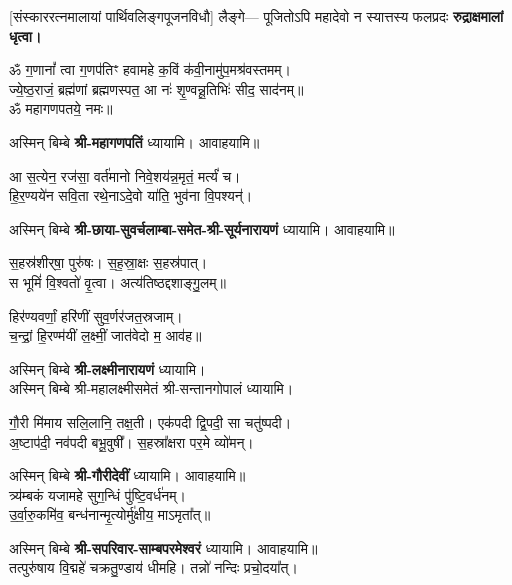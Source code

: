 [संस्काररत्नमालायां पार्थिवलिङ्गपूजनविधौ] लैङ्गे—
{पूजितोऽपि महादेवो न स्यात्तस्य फलप्रदः}
\textbf{रुद्राक्षमालां धृत्वा।}





\begin{center}


ॐ ग॒णानां᳚ त्वा ग॒णप॑तिꣳ हवामहे क॒विं क॑वी॒नामु॑प॒मश्र॑\-वस्तमम्।\\
ज्ये॒ष्ठ॒राजं॒ ब्रह्म॑णां ब्रह्मणस्पत॒ आ नः॑ शृ॒ण्वन्नू॒तिभिः॑ सीद॒ साद॑नम्॥\\
ॐ महागणपतये॒ नमः॥

अस्मिन् बिम्बे \textbf{श्री-महागणपतिं} ध्यायामि। आवाहयामि॥

आ स॒त्येन॒ रज॑सा॒ वर्त॑मानो निवे॒शय॑न्न॒मृतं॒ मर्त्यं॑ च।\\
हि॒र॒ण्यये॑न सवि॒ता रथे॒नाऽदे॒वो या॑ति॒ भुव॑ना वि॒पश्यन्॑।

अस्मिन् बिम्बे \textbf{श्री-छाया-सुवर्चलाम्बा-समेत-श्री-सूर्यनारायणं} ध्यायामि। आवाहयामि॥

स॒हस्र॑शीर्‌षा॒ पुरु॑षः। स॒ह॒स्रा॒क्षः स॒हस्र॑पात्।\\
स भूमिं॑ वि॒श्वतो॑ वृ॒त्वा। अत्य॑तिष्ठद्दशाङ्गु॒लम्॥

हिर॑ण्यवर्णां॒ हरि॑णीं सुव॒र्णर॑जत॒स्रजाम्।\\
च॒न्द्रां॒ हि॒रण्म॑यीं ल॒क्ष्मीं॒ जात॑वेदो म॒ आव॑ह॥

अस्मिन् बिम्बे \textbf{श्री-लक्ष्मीनारायणं} ध्यायामि।\\
अस्मिन् बिम्बे श्री-महालक्ष्मीसमेतं श्री-सन्तानगोपालं ध्यायामि।

गौ॒री मि॑माय सलि॒लानि॒ तक्ष॒ती। एक॑पदी द्वि॒पदी॒ सा चतु॑ष्पदी।\\
अ॒ष्टाप॑दी॒ नव॑पदी बभू॒वुषी᳚। स॒हस्रा᳚क्षरा पर॒मे व्यो॑मन्।

अस्मिन् बिम्बे \textbf{श्री-गौरीदेवीं} ध्यायामि। आवाहयामि॥\\

त्र्य॑म्बकं यजामहे सुग॒न्धिं पु॑ष्टि॒वर्ध॑नम्।\\
उ॒र्वा॒रु॒कमि॑व॒ बन्ध॑नान्मृ॒त्योर्मु॑क्षीय॒ माऽमृता᳚त्॥

अस्मिन् बिम्बे \textbf{श्री-सपरिवार-साम्बपरमेश्वरं} ध्यायामि। आवाहयामि॥\\

तत्पुरु॑षाय वि॒द्महे॑ चक्रतु॒ण्डाय॑ धीमहि। तन्नो॑ नन्दिः प्रचो॒दया᳚त्।


\end{center}
